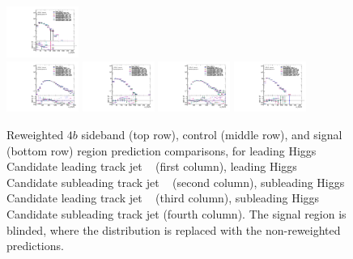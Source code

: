\begin{figure}[htbp!]
\begin{center}
\includegraphics[width=0.21\textwidth,angle=-90]{figures/boosted/AppendixReweight/Compare/Data_FourTag_Control_directcompare_sublHCand_trk1_Pt_1.pdf}\\
\includegraphics[width=0.21\textwidth,angle=-90]{figures/boosted/AppendixReweight/Compare/Data_FourTag_Signal_directcompare_leadHCand_trk0_Pt_1.pdf}
\includegraphics[width=0.21\textwidth,angle=-90]{figures/boosted/AppendixReweight/Compare/Data_FourTag_Signal_directcompare_leadHCand_trk1_Pt_1.pdf}
\includegraphics[width=0.21\textwidth,angle=-90]{figures/boosted/AppendixReweight/Compare/Data_FourTag_Signal_directcompare_sublHCand_trk0_Pt_1.pdf}
\includegraphics[width=0.21\textwidth,angle=-90]{figures/boosted/AppendixReweight/Compare/Data_FourTag_Signal_directcompare_sublHCand_trk1_Pt_1.pdf}\\
\caption{Reweighted $4b$ sideband (top row), control (middle row), and signal (bottom row) region prediction comparisons, for leading Higgs Candidate leading track jet \pt~ (first column),  leading Higgs Candidate subleading track jet \pt~ (second column), subleading Higgs Candidate leading track jet \pt~ (third column), subleading Higgs Candidate subleading track jet \pt (fourth column). The signal region is blinded, where the distribution is replaced with the non-reweighted predictions.}
\label{fig:app-rw-comp-4b-trkjet}
\end{center}
\end{figure}


